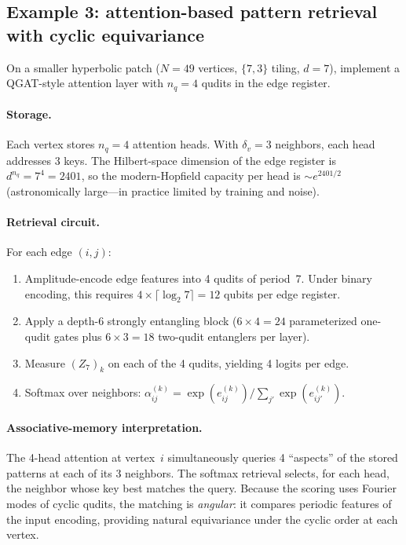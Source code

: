 \documentclass[11pt,oneside]{amsbook}
\numberwithin{equation}{section}
\theoremstyle{plain}
\theoremstyle{definition}
\theoremstyle{remark}
\begin{document}
\subsection{Example 3: attention-based pattern retrieval with cyclic equivariance}
\label{subsec:qham_example_attention}

On a smaller hyperbolic patch ($N=49$ vertices, $\{7,3\}$ tiling, $d=7$), implement a
QGAT-style attention layer with $n_q=4$ qudits in the edge register.

\paragraph{Storage.}
Each vertex stores $n_q=4$ attention heads.  With $\delta_v=3$ neighbors, each head addresses
3 keys.  The Hilbert-space dimension of the edge register is $d^{n_q}=7^4=2401$, so the
modern-Hopfield capacity per head is $\sim e^{2401/2}$ (astronomically large---in practice
limited by training and noise).

\paragraph{Retrieval circuit.}
For each edge $(i,j)$:
\begin{enumerate}
\item Amplitude-encode edge features into 4 qudits of period~7.  Under binary encoding, this
requires $4\times\lceil\log_2 7\rceil=12$ qubits per edge register.
\item Apply a depth-6 strongly entangling block ($6\times 4=24$ parameterized one-qudit gates plus
$6\times 3=18$ two-qudit entanglers per layer).
\item Measure $(Z_7)_k$ on each of the 4 qudits, yielding 4 logits per edge.
\item Softmax over neighbors: $\alpha_{ij}^{(k)}=\exp(e_{ij}^{(k)})/\sum_{j'}\exp(e_{ij'}^{(k)})$.
\end{enumerate}

\paragraph{Associative-memory interpretation.}
The 4-head attention at vertex~$i$ simultaneously queries 4 ``aspects'' of the stored patterns
at each of its 3 neighbors.  The softmax retrieval selects, for each head, the neighbor whose
key best matches the query.  Because the scoring uses Fourier modes of cyclic qudits, the
matching is \emph{angular}: it compares periodic features of the input encoding, providing
natural equivariance under the cyclic order at each vertex.
\end{document}
